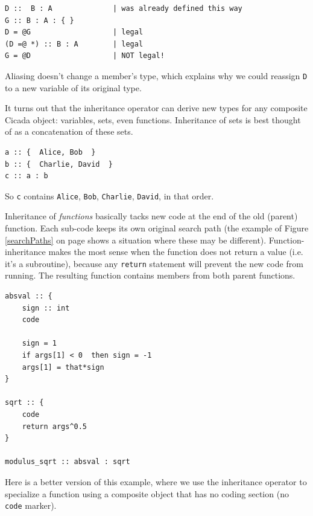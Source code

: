 \documentclass{article}
\newenvironment{code}{
       \begin{list}{}{
               \setlength{\leftmargin}{.4in}
               \setlength{\rightmargin}{0in}
               \setlength{\topsep}{.2in}
       }
       \small
       \item[] }
       { \end{list}   }
\begin{document}
\begin{code} \begin{verbatim}
D ::  B : A              | was already defined this way
G :: B : A : { }
D = @G                   | legal
(D =@ *) :: B : A        | legal
G = @D                   | NOT legal!
\end{verbatim} \end{code}

\noindent Aliasing doesn't change a member's type, which explains why we could reassign \verb#D# to a new variable of its original type.

It turns out that the inheritance operator can derive new types for any composite Cicada object:  variables, sets, even functions.  Inheritance of sets is best thought of as a concatenation of these sets.

\begin{code} \begin{verbatim}
a :: {  Alice, Bob  }
b :: {  Charlie, David  }
c :: a : b
\end{verbatim} \end{code}

\noindent So \texttt{c} contains \texttt{Alice}, \texttt{Bob}, \texttt{Charlie}, \texttt{David}, in that order.

Inheritance of \emph{functions} basically tacks new code at the end of the old (parent) function.  Each sub-code keeps its own original search path (the example of Figure \ref{searchPaths} on page \pageref{searchPaths} shows a situation where these may be different).  Function-inheritance makes the most sense when the function does not return a value (i.e. it's a subroutine), because any \verb#return# statement will prevent the new code from running.  The resulting function contains members from both parent functions.

\begin{code} \begin{verbatim}
absval :: {
    sign :: int
    code
    
    sign = 1
    if args[1] < 0  then sign = -1
    args[1] = that*sign
}

sqrt :: {
    code
    return args^0.5
}

modulus_sqrt :: absval : sqrt
\end{verbatim} \end{code}

Here is a better version of this example, where we use the inheritance operator to specialize a function using a composite object that has no coding section (no \verb#code# marker).
\end{document}
